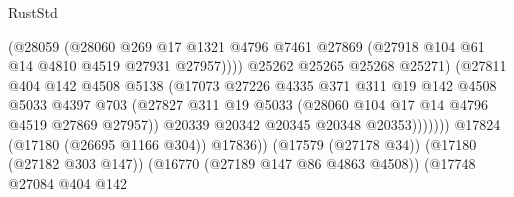 \begin{lexlean}{RustStd}
\begin{coremodule}
                                              (@28059
                                                (@28060
                                                  @269
                                                  @17
                                                  @1321
                                                  @4796
                                                  @7461
                                                  @27869
                                                  (@27918 @104 @61 @14 @4810 @4519 @27931 @27957))))
                                            @25262
                                            @25265
                                            @25268
                                            @25271)
                                          (@27811
                                            @404
                                            @142
                                            @4508
                                            @5138
                                            (@17073
                                              @27226
                                              @4335
                                              @371
                                              @311
                                              @19
                                              @142
                                              @4508
                                              @5033
                                              @4397
                                              @703
                                              (@27827
                                                @311
                                                @19
                                                @5033
                                                (@28060 @104 @17 @14 @4796 @4519 @27869 @27957))
                                              @20339
                                              @20342
                                              @20345
                                              @20348
                                              @20353)))))))
                                @17824
                                (@17180 (@26695 @1166 @304))
                                @17836))
                            (@17579 (@27178 @34))
                            (@17180 (@27182 @303 @147))
                            (@16770 (@27189 @147 @86 @4863 @4508))
                            (@17748
                              @27084
                              @404
                              @142

\end{coremodule}
\end{lexlean}
